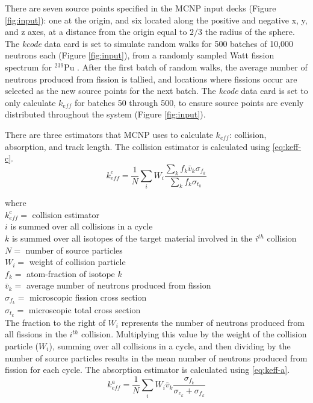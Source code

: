 There are seven source points specified in the MCNP input decks (Figure \ref{fig:input}): one at the origin, and six located along the positive and negative x, y, and z axes, at a distance from the origin equal to $2/3$ the radius of the sphere.
The \textit{kcode} data card is set to simulate random walks for 500 batches of 10,000 neutrons each (Figure \ref{fig:input}), from a randomly sampled Watt fission spectrum for $^{239}$Pu \cite{mcnp}.
After the first batch of random walks, the average number of neutrons produced from fission is tallied, and locations where fissions occur are selected as the new source points for the next batch.
The \textit{kcode} data card is set to only calculate $k_{eff}$ for batches 50 through 500, to ensure source points are evenly distributed throughout the system (Figure \ref{fig:input}).

There are three estimators that MCNP uses to calculate $k_{eff}$: collision, absorption, and track length.
The collision estimator is calculated using \ref{eq:keff-c}.
%
\begin{equation}
  \label{eq:keff-c}
  k_{eff}^{c} = \frac{1}{N} \sum_{i} W_{i} \frac{\sum_{k} f_{k} \bar{v}_{k} \sigma_{f_{k}}}{\sum_{k} f_{k} \sigma_{t_{k}}}
\end{equation}

\noindent where \\
\indent $k_{eff}^{c} = $ collision estimator \\
\indent $i$ is summed over all collisions in a cycle \\ 
\indent $k$ is summed over all isotopes of the target material involved in the $i^{th}$ collision \\
\indent $N = $ number of source particles \\
\indent $W_{i} = $ weight of collision particle \\
\indent $f_{k} = $ atom-fraction of isotope $k$ \\
\indent $\bar{v}_{k} = $ average number of neutrons produced from fission \\
\indent $\sigma_{f_{k}} = $ microscopic fission cross section \\
\indent $\sigma_{t_{k}} = $ microscopic total cross section \\

\noindent The fraction to the right of $W_{i}$ represents the number of neutrons produced from all fissions in the $i^{th}$ collision.
Multiplying this value by the weight of the collision particle ($W_{i}$), summing over all collisions in a cycle, and then dividing by the number of source particles results in the mean number of neutrons produced from fission for each cycle.
The absorption estimator is calculated using \ref{eq:keff-a}.
%
\begin{equation}
  \label{eq:keff-a}
  k_{eff}^{a} = \frac{1}{N} \sum_{i} W_{i} \bar{v}_{k} \frac{\sigma_{f_{k}}} {\sigma_{c_{k}} + \sigma_{f_{k}}}
\end{equation}

